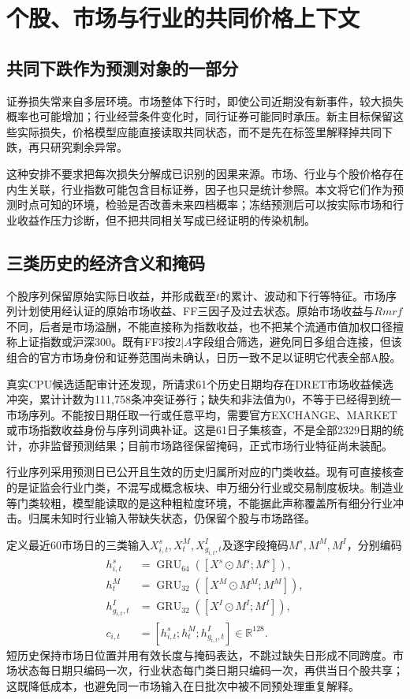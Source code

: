 \section{个股、市场与行业的共同价格上下文}
\subsection{共同下跌作为预测对象的一部分}
证券损失常来自多层环境。市场整体下行时，即使公司近期没有新事件，较大损失概率也可能增加；行业经营条件变化时，同行证券可能同时承压。新主目标保留这些实际损失，价格模型应能直接读取共同状态，而不是先在标签里解释掉共同下跌，再只研究剩余异常。

这种安排不要求把每次损失分解成已识别的因果来源。市场、行业与个股价格存在内生关联，行业指数可能包含目标证券，因子也只是统计参照。本文将它们作为预测时点可知的环境，检验是否改善未来四档概率；冻结预测后可以按实际市场和行业收益作压力诊断，但不把共同相关写成已经证明的传染机制。


\subsection{三类历史的经济含义和掩码}
个股序列保留原始实际日收益，并形成截至$t$的累计、波动和下行等特征。市场序列计划使用经认证的原始市场收益、FF三因子及过去状态。原始市场收益与$Rmrf$不同，后者是市场溢酬，不能直接称为指数收益，也不把某个流通市值加权口径擅称上证指数或沪深300。既有FF3按$2|A$字段组合筛选，避免同日多组合连接，但该组合的官方市场身份和证券范围尚未确认，日历一致不足以证明它代表全部A股。

真实CPU候选适配审计还发现，所请求61个历史日期均存在DRET市场收益候选冲突，累计计数为111,758条冲突证券行；缺失和非法值为0，不等于已经得到统一市场序列。不能按日期任取一行或任意平均，需要官方EXCHANGE、MARKET或市场指数收益身份与序列词典补证。这是61日子集核查，不是全部2329日期的统计，亦非监督预测结果；目前市场路径保留掩码，正式市场行业特征尚未装配。

行业序列采用预测日已公开且生效的历史归属所对应的门类收益。现有可直接核查的是证监会行业门类，不混写成概念板块、申万细分行业或交易制度板块。制造业等门类较粗，模型能读取的是这种粗粒度环境，不能据此声称覆盖所有细分行业冲击。归属未知时行业输入带缺失状态，仍保留个股与市场路径。

定义最近60市场日的三类输入$X^s_{i,t},X^M_t,X^I_{g_{i,t},t}$及逐字段掩码$M^s,M^M,M^I$，分别编码
\begin{align}
 h^s_{i,t}&=\operatorname{GRU}_{64}([X^s\odot M^s;M^s]),\\
 h^M_t&=\operatorname{GRU}_{32}([X^M\odot M^M;M^M]),\\
 h^I_{g_{i,t},t}&=\operatorname{GRU}_{32}([X^I\odot M^I;M^I]),\\
 c_{i,t}&=[h^s_{i,t};h^M_t;h^I_{g_{i,t},t}]\in\mathbb R^{128}.
 \label{eq:context}
\end{align}
短历史保持市场日位置并用有效长度与掩码表达，不跳过缺失日形成不同跨度。市场状态每日期只编码一次，行业状态每门类日期只编码一次，再供当日个股共享；这既降低成本，也避免同一市场输入在日批次中被不同预处理重复解释。

